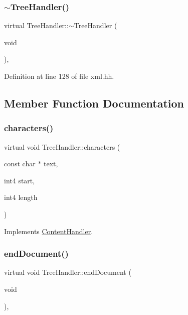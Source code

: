 \subsubsection{\texorpdfstring{$\sim$TreeHandler()}{~TreeHandler()}}
{\footnotesize\ttfamily virtual Tree\+Handler\+::$\sim$\+Tree\+Handler (\begin{DoxyParamCaption}\item[{void}]{ }\end{DoxyParamCaption})\hspace{0.3cm}{\ttfamily [inline]}, {\ttfamily [virtual]}}



Definition at line 128 of file xml.\+hh.



\subsection{Member Function Documentation}
\mbox{\label{class_tree_handler_a40a58757a18ccf3b2b272d49b5478893}} 
\subsubsection{\texorpdfstring{characters()}{characters()}}
{\footnotesize\ttfamily virtual void Tree\+Handler\+::characters (\begin{DoxyParamCaption}\item[{const char $\ast$}]{text,  }\item[{int4}]{start,  }\item[{int4}]{length }\end{DoxyParamCaption})\hspace{0.3cm}{\ttfamily [virtual]}}



Implements \mbox{\hyperlink{class_content_handler_a546761acfc0e8cc5fe72bbceaccf9f9e}{Content\+Handler}}.

\mbox{\label{class_tree_handler_abe5bde3cb1ac0f928ddfef83921f455f}} 
\subsubsection{\texorpdfstring{endDocument()}{endDocument()}}
{\footnotesize\ttfamily virtual void Tree\+Handler\+::end\+Document (\begin{DoxyParamCaption}\item[{void}]{ }\end{DoxyParamCaption})\hspace{0.3cm}{\ttfamily [inline]}, {\ttfamily [virtual]}}



